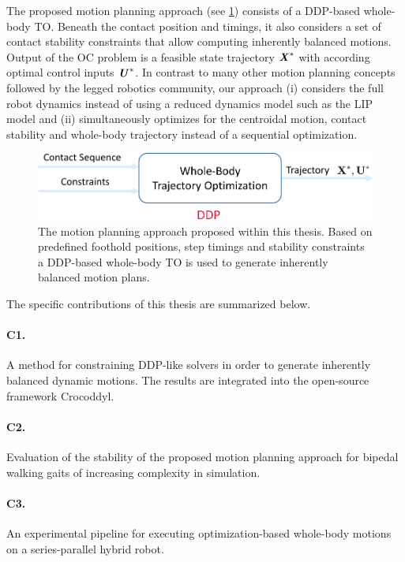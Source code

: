 The proposed motion planning approach (see \cref{img:approach}) consists of a DDP-based whole-body \gls{TO}. 
Beneath the contact position and timings, it also considers a set of contact stability constraints that allow computing inherently balanced motions. Output of the \gls{OC} problem is a feasible state trajectory $\bm{\mathit{X}}^*$ with according optimal control inputs $\bm{\mathit{U}}^*$. In contrast to many other motion planning concepts followed by the legged robotics community, our approach (i) considers the full robot dynamics instead of using a reduced dynamics model such as the \gls{LIP} model and (ii) simultaneously optimizes for the centroidal motion, contact stability and whole-body trajectory instead of a sequential optimization. 

\begin{figure}
\centering	
\includegraphics[width=.8\textwidth]{img/approach}
\caption[Overall motion planning approach proposed within this thesis]{The motion planning approach proposed within this thesis. Based on predefined foothold positions, step timings and stability constraints a \gls{DDP}-based whole-body \gls{TO} is used to generate inherently balanced motion plans.}
\label{img:approach}
\end{figure}

The specific contributions of this thesis are summarized below.

\paragraph{C1.} A method for constraining DDP-like solvers in order to generate inherently balanced dynamic motions. The results are integrated into the open-source framework Crocoddyl.
\paragraph{C2.} Evaluation of the stability of the proposed motion planning approach for bipedal walking gaits of increasing complexity in simulation.
\paragraph{C3.} An experimental pipeline for executing optimization-based whole-body motions on a series-parallel hybrid robot.
